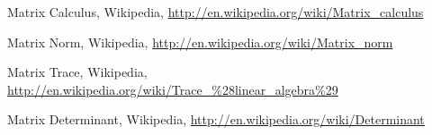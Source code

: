 	Matrix Calculus, Wikipedia, 
	\url{http://en.wikipedia.org/wiki/Matrix_calculus}
	
	Matrix Norm, Wikipedia, 
	\url{http://en.wikipedia.org/wiki/Matrix_norm}
	
	Matrix Trace, Wikipedia, 
	\url{http://en.wikipedia.org/wiki/Trace_%28linear_algebra%29}
	
	Matrix Determinant, Wikipedia, 
	\url{http://en.wikipedia.org/wiki/Determinant}